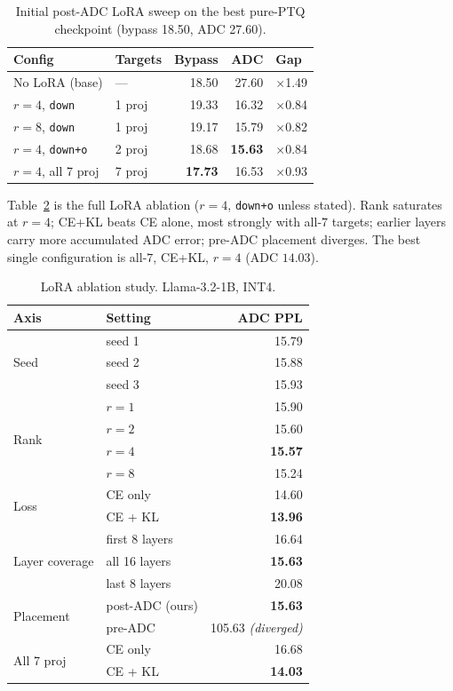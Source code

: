 \documentclass[letterpaper]{article} %
\theoremstyle{plain}
\begin{document}
\begin{table}[htbp]
\centering
\begin{tabular}{@{}llrrl@{}}
\toprule
\textbf{Config} & \textbf{Targets} & \textbf{Bypass} & \textbf{ADC} & \textbf{Gap} \\
\midrule
No LoRA (base)      & ---    & 18.50 & 27.60 & $\times$1.49 \\
$r=4$, \texttt{down}    & 1 proj & 19.33 & 16.32 & $\times$0.84 \\
$r=8$, \texttt{down}    & 1 proj & 19.17 & 15.79 & $\times$0.82 \\
$r=4$, \texttt{down+o}  & 2 proj & 18.68 & \textbf{15.63} & $\times$0.84 \\
$r=4$, all 7 proj   & 7 proj & \textbf{17.73} & 16.53 & $\times$0.93 \\
\bottomrule
\end{tabular}
\caption{Initial post-ADC LoRA sweep on the best pure-PTQ checkpoint (bypass 18.50, ADC 27.60).}
\label{tab:lorav6}
\end{table}

Table~\ref{tab:lorav7} is the full LoRA ablation ($r=4$, \texttt{down+o} unless stated). Rank saturates at $r=4$; CE+KL beats CE alone, most strongly with all-$7$ targets; earlier layers carry more accumulated ADC error; pre-ADC placement diverges. The best single configuration is all-$7$, CE+KL, $r=4$ (ADC $14.03$).

\begin{table}[htbp]
\centering
\begin{tabular}{@{}llr@{}}
\toprule
\textbf{Axis} & \textbf{Setting} & \textbf{ADC PPL} \\
\midrule
\multirow{3}{*}{Seed}
  & seed 1 & 15.79 \\
  & seed 2 & 15.88 \\
  & seed 3 & 15.93 \\
\midrule
\multirow{4}{*}{Rank}
  & $r=1$ & 15.90 \\
  & $r=2$ & 15.60 \\
  & $r=4$ & \textbf{15.57} \\
  & $r=8$ & 15.24 \\
\midrule
\multirow{2}{*}{Loss}
  & CE only        & 14.60 \\
  & CE + KL        & \textbf{13.96} \\
\midrule
\multirow{3}{*}{Layer coverage}
  & first 8 layers & 16.64 \\
  & all 16 layers  & \textbf{15.63} \\
  & last 8 layers  & 20.08 \\
\midrule
\multirow{2}{*}{Placement}
  & post-ADC (ours) & \textbf{15.63} \\
  & pre-ADC         & 105.63 \textit{(diverged)} \\
\midrule
\multirow{2}{*}{All 7 proj}
  & CE only   & 16.68 \\
  & CE + KL   & \textbf{14.03} \\
\bottomrule
\end{tabular}
\caption{LoRA ablation study. Llama-3.2-1B, INT4.}
\label{tab:lorav7}
\end{table}
\end{document}
